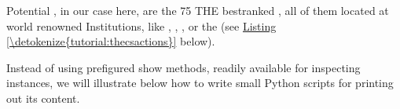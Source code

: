 \documentclass[a4paper,12pt,english]{sphinxhowto}
\begin{document}
Potential , in our case here, are the 75 THE best\sphinxhyphen{}ranked , all of them located at world renowned Institutions, like , , ,  or the  (see \hyperref[\detokenize{tutorial:thecsactions}]{Listing \ref{\detokenize{tutorial:thecsactions}}} below).

Instead of using prefigured  show methods, readily available for inspecting  instances, we will illustrate below how to write small Python scripts for printing out its content.
\def\sphinxLiteralBlockLabel{\label{\detokenize{tutorial:thecsactions}}}
\end{document}
